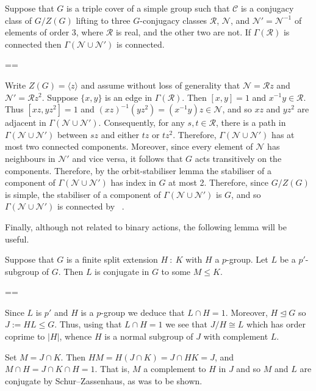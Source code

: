 \documentclass[11pt, a4paper]{amsart}
\makeatletter
\def\cn{\mathord{{\!\:{:}\:\!}}}
\renewcommand{\proofname}{Proof}
\renewenvironment{proof}[1][\proofname]{\par
  \pushQED{\qed}  \normalfont \partopsep=\z@skip \topsep=\z@skip
  \trivlist
  \item[\hskip\labelsep
        \scshape
    #1\@addpunct{.}]\ignorespaces
}{  \popQED\endtrivlist\@endpefalse
}
\makeatother
\begin{document}
\begin{lemma}\label{lem:conn3cov}
Suppose that $G$ is a triple cover of a simple group such that $\mathcal{C}$ is a conjugacy class of $G/Z(G)$ lifting to three $G$-conjugacy classes $\mathcal R$, $\mathcal N$, and $\mathcal{N}'=\mathcal N^{-1}$ of elements of order 3, where $\mathcal{R}$ is real, and the other two are not. If $\Gamma(\mathcal{R})$ is connected then $\Gamma(\mathcal{N}\cup\mathcal{N}')$ is connected.
\end{lemma}
\begin{proof}
    Write $Z(G)=\langle z\rangle$ and assume without loss of generality that $\mathcal{N}=\mathcal{R}z$ and $\mathcal{N}'=\mathcal{R}z^2$. Suppose $\{x,y\}$ is an edge in $\Gamma(\mathcal{R})$. Then $[x,y]=1$ and $x^{-1}y\in\mathcal{R}$. Thus $[xz,yz^2]=1$ and $(xz)^{-1}(yz^2)=(x^{-1}y)z\in\mathcal{N}$, and so $xz$ and $yz^2$ are adjacent in $\Gamma(\mathcal{N}\cup\mathcal{N}').$ Consequently, for any $s,t\in\mathcal{R}$, there is a path in $\Gamma(\mathcal{N}\cup\mathcal{N}')$ between $sz$ and either $tz$ or $tz^2$. Therefore, $\Gamma(\mathcal{N}\cup\mathcal{N}')$ has     at most two connected components. Moreover, since every element of $\mathcal{N}$ has neighbours in $\mathcal{N}'$ and vice versa, it follows that $G$ acts transitively on the components. Therefore, by the orbit-stabiliser lemma the stabiliser of a component of $\Gamma(\mathcal{N}\cup\mathcal{N}')$ has index in $G$ at most 2. Therefore, since $G/Z(G)$ is simple, the stabiliser of a component of $\Gamma(\mathcal{N}\cup\mathcal{N}')$ is $G$, and so $\Gamma(\mathcal{N}\cup\mathcal{N}')$ is connected by ~\cite[Lemma 2.2]{CDP}.
\end{proof}

Finally, although not related to binary actions, the following lemma will be useful.
\begin{lemma}\label{lem:SZappl}
    Suppose that $G$ is a finite split extension $H\cn K$ with $H$ a $p$-group. Let $L$ be a $p'$-subgroup of $G$. Then $L$ is conjugate in $G$ to some $M\leq K$.
\end{lemma}
\begin{proof}
    Since $L$ is $p'$ and $H$ is a $p$-group we deduce that $L\cap H=1$. Moreover, $H\trianglelefteq G$ so $J:=HL\leq G$. Thus, using that $L\cap H=1$ we see that $J/H\cong L$ which has order coprime to $|H|$, whence $H$ is a normal subgroup of $J$ with complement $L$.

    Set $M=J\cap K$. Then $HM=H(J\cap K)=J\cap HK=J$, and $M\cap H=J\cap K\cap H=1$. That is, $M$ a complement to $H$ in $J$ and so $M$ and $L$ are conjugate by Schur--Zassenhaus, as was to be shown.
\end{proof}
\end{document}
